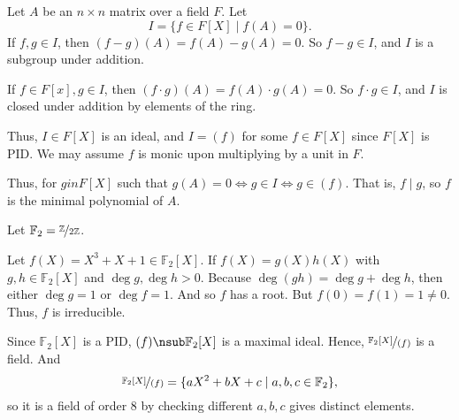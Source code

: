 \begin{example}
    Let \(A\) be an \(n \times n\) matrix over a field \(F\). Let
    \[I = \{f \in F[X]\mid f(A) = 0\}.\]
    If \(f, g\in I\), then \((f-g)(A) = f(A) - g(A) = 0\). So \(f-g \in I\), and \(I\) is a subgroup under addition.

    If \(f\in F[x], g\in I\), then \((f\cdot g)(A) = f(A) \cdot g(A) = 0\). So \(f\cdot g \in I\), and \(I\) is closed under addition by elements of the ring.

    Thus, \(I \in F[X]\) is an ideal, and \(I = (f)\) for some \(f \in F[X]\) since \(F[X]\) is PID. We may assume \(f\) is monic upon multiplying by a unit in \(F\).

    Thus, for \(g in F[X]\) such that \(g(A) = 0 \iff g \in I \iff g \in (f)\). That is, \(f \mid g\), so \(f\) is the minimal polynomial of \(A\).
\end{example}
\begin{example}[Field of 8]
    Let \(\mathbb{F}_2 = \nicefrac{\mathbb{Z}}{2\mathbb{Z}}\).

    Let \(f(X) = X^3 + X + 1 \in \mathbb{F}_2[X]\). If \(f(X) = g(X)h(X)\) with \(g, h \in \mathbb{F}_2[X]\) and \(\deg g, \deg h > 0\). Because \(\deg(gh) = \deg g + \deg h\), then either \(\deg g = 1\) or \(\deg f = 1\). And so \(f\) has a root. But \(f(0) = f(1) = 1 \neq 0\). Thus, \(f\) is irreducible.

    Since \(\mathbb{F}_2[X]\) is a PID, \((f) \nsub \mathbb{F}_2[X]\) is a maximal ideal. Hence, \(\nicefrac{\mathbb{F}_2[X]}{(f)}\) is a field. And
    \[
        \nicefrac{\mathbb{F}_2[X]}{(f)} = \{aX^2 + bX + c \mid a,b,c \in \mathbb{F}_2\},
    \]
    so it is a field of order 8 by checking different \(a,b,c\) gives distinct elements.
\end{example}